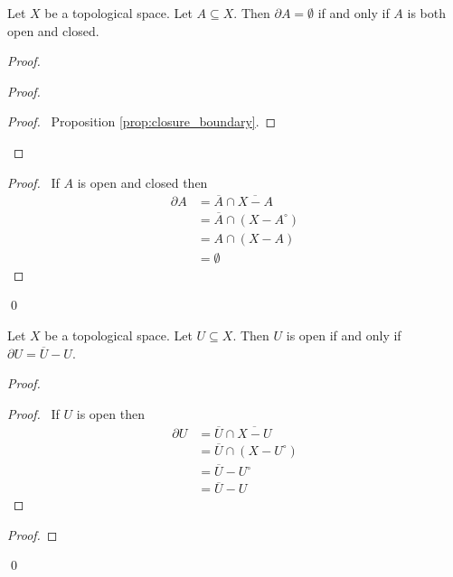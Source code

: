 \begin{prop}
Let $X$ be a topological space. Let $A \subseteq X$. Then $\partial A = \emptyset$ if and only if $A$ is both open and closed.
\end{prop}

\begin{proof}
\pf
{}
\begin{proof}
	\begin{proof}
		\pf\ Proposition \ref{prop:closure_boundary}.
	\end{proof}
\end{proof}
\begin{proof}
	\pf\ If $A$ is open and closed then
	\begin{align*}
	\partial A & = \overline{A} \cap \overline{X-A} \\
	& = \overline{A} \cap (X - A^\circ) \\
	& = A \cap (X - A) \\
	& = \emptyset
	\end{align*}
\end{proof}
\qed
\end{proof}

\begin{prop}
Let $X$ be a topological space. Let $U \subseteq X$. Then $U$ is open if and only if $\partial U = \overline{U} - U$.
\end{prop}

\begin{proof}
\pf
{}
\begin{proof}
	\pf\ If $U$ is open then
	\begin{align*}
		\partial U & = \overline{U} \cap \overline{X-U} \\
		& = \overline{U} \cap (X - U^\circ) \\
		& = \overline{U} - U^\circ \\
		& = \overline{U} - U 
	\end{align*}
\end{proof}
\begin{proof}
\end{proof}
\qed
\end{proof}

